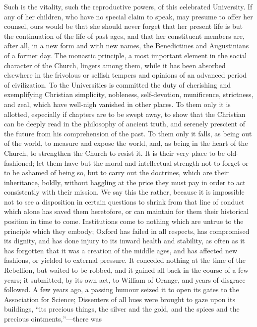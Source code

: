 Such is the vitality, such the
reproductive powers, of this celebrated University. If any of her
children, who have no special claim to speak, may presume to offer her
counsel, ours would be that she should never forget that her present
life is but the continuation of the life of past ages, and that her
constituent members are, after all, in a new form and with new names,
the Benedictines and Augustinians of a former day. The monastic
principle, a most important element in the social character of the
Church, lingers among them, while it has been absorbed elsewhere in
the frivolous or selfish tempers and opinions of an advanced period of
civilization. To the Universities is committed the duty of cherishing
and exemplifying Christian simplicity, nobleness, self-devotion,
munificence, strictness, and zeal, which have well-nigh vanished in
other places. To them only it is allotted, especially if chapters are
to be swept away, to show that the Christian can be deeply read in the
philosophy of ancient truth, and serenely prescient of the future from
his comprehension of the past. To them only it falls, as being out of
the world, to measure and expose the world, and, as being in the heart
of the Church, to strengthen the Church to resist it. It is their very
place to be old-fashioned; let them have but the moral and
intellectual strength not to forget or to be ashamed of being so, but
to carry out the doctrines, which are their inheritance, boldly,
without haggling at the price they must pay in order to act
consistently with their mission. We say this the rather, because it is
impossible not to see a disposition in certain questions to shrink
from that line of conduct which alone has saved them heretofore, or
can maintain for them their historical position in time to come.
Institutions come to nothing which are untrue to the principle which
they embody; Oxford has failed in all respects, has compromised its
dignity, and has done injury to its inward health and stability, as
often as it has forgotten that it was a creation of the middle ages,
and has affected new fashions, or yielded to external pressure. It
conceded nothing at the time of the Rebellion, but waited to be
robbed, and it gained all back in the course of a few years; it
submitted, by its own act, to William of Orange, and years of disgrace
followed. A few years ago, a passing humour seized it to open its
gates to the Association for Science; Dissenters of all hues were
brought to gaze upon its buildings, ``its precious things, the silver
and the gold, and the spices and the precious ointments,''—there was
